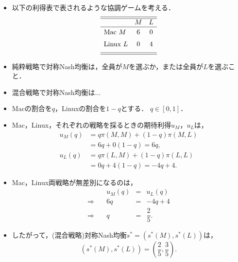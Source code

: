 \documentclass[uplatex,12pt,dvipdfmx,xcolor=svgnames]{beamer}
\begin{document}
\begin{frame}[t]{\secIV}
	
\begin{itemize}
	\item 以下の利得表で表されるような協調ゲームを考える．
		\begin{equation*}
			\begin{array}{lcc}
				\hline\hline\\[-12pt]
				& M & L \\ \hline \\[-10pt]
				\text{Mac}\ M & 6 & 0 \\[2mm]
				\text{Linux}\ L & 0 & 4 \\[2mm]
				\hline\hline
			\end{array}
		\end{equation*}
	\item 純粋戦略で対称Nash均衡は，全員が$M$を選ぶか，または全員が$L$を選ぶこと．
	\item 混合戦略で対称Nash均衡は$\ldots$
	\item Macの割合を$q$，Linuxの割合を$1-q$とする．
		$q \in[0, 1]$．
	\item Mac，Linux，それぞれの戦略を採るときの期待利得$u_M$，$u_L$は，
		\begin{align*}
			u_M(q) &= q \pi(M, M) + (1-q) \pi(M, L) \\
			&= 6q+0(1-q) = 6q, \\
			u_L(q) &= q \pi(L, M) + (1-q) \pi(L, L) \\
			&= 0q+4(1-q) = -4q+4.
		\end{align*}
	\item Mac，Linux両戦略が無差別になるのは，
		\begin{equation*}
			\begin{array}{rrcl}
				& u_M(q) & = & u_L(q) \\
				\Longrightarrow \quad 
				& 6q & = & -4q+4 \\
				\Longrightarrow \quad 
				& q & = & \dfrac{2}{5}.
			\end{array}
		\end{equation*}
	\item したがって，(混合戦略)対称Nash均衡$s^*=(s^*(M), s^*(L))$は，
		\begin{equation*}
			(s^*(M), s^*(L)) = \left(\frac{2}{5}, \frac{3}{5} \right).
		\end{equation*}
\end{itemize}
	
	
\end{frame}
\end{document}
